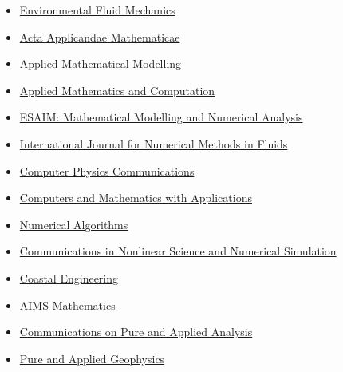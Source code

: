 \documentclass[final, a4paper, oneside, 12pt]{article}
\numberwithin{equation}{section}
\begin{document}
\begin{itemize}
    \item \href{https://link.springer.com/journal/10652/}%
    {Environmental Fluid Mechanics}

    \item \href{https://link.springer.com/journal/10440/}%
    {Acta Applicandae Mathematicae}
    
    \item \href{http://www.journals.elsevier.com/applied-mathematical-modelling/}%
    {Applied Mathematical Modelling}
    
    \item \href{http://www.journals.elsevier.com/applied-mathematics-and-computation/}%
    {Applied Mathematics and Computation}

    \item \href{https://www.esaim-m2an.org/}%
   {ESAIM: Mathematical Modelling and Numerical Analysis}

    \item \href{https://onlinelibrary.wiley.com/journal/10970363/}%
    {International Journal for Numerical Methods in Fluids}
    
    \item \href{https://www.journals.elsevier.com/computer-physics-communications}{Computer Physics Communications}
    
    \item \href{http://www.journals.elsevier.com/computers-and-mathematics-with-applications/}%
    {Computers and Mathematics with Applications}
    
    \item \href{http://www.springerlink.com/content/101751/}{Numerical Algorithms}
    
    \item \href{http://www.journals.elsevier.com/communications-in-nonlinear-science-and-numerical-simulation}%
    {Communications in Nonlinear Science and Numerical Simulation}

    \item \href{https://www.sciencedirect.com/journal/coastal-engineering/}{Coastal Engineering}

    \item \href{https://www.aimspress.com/journal/Math/}{AIMS Mathematics}
   
    \item \href{http://aimsciences.org/journals/cpaa/}%
    {Communications on Pure and Applied Analysis}

    \item \href{https://www.springer.com/journal/24}%
    {Pure and Applied Geophysics}
    

\end{itemize}
\end{document}
